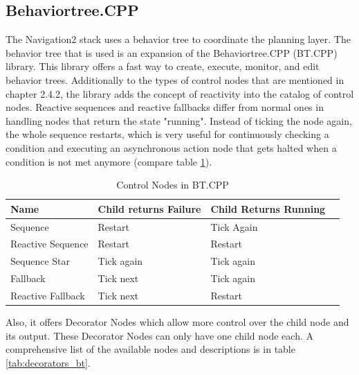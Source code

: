 \subsection{Behaviortree.CPP}
The Navigation2 stack uses a behavior tree to coordinate the planning layer. The behavior tree that is used is an expansion of the Behaviortree.CPP (BT.CPP) library. This library offers a fast way to create, execute, monitor, and edit behavior trees. 
Additionally to the types of control nodes that are mentioned in chapter 2.4.2, the library adds the concept of reactivity into the catalog of control nodes. Reactive sequences and reactive fallbacks differ from normal ones in handling nodes that return the state "running". Instead of ticking the node again, the whole sequence restarts, which is very useful for continuously checking a condition and executing an asynchronous action node that gets halted when a condition is not met anymore (compare table \ref{tab:control_nodes_bt}). 

\begin{table}[ht]
	\caption{Control Nodes in BT.CPP}
	\label{tab:control_nodes_bt}
	\begin{tabular}{ | m{} | m{}| m{} | m{} |} 
  	\hline
  	Name & Child returns Failure & Child Returns Running \\ 
  	\hline
  	Sequence & Restart & Tick Again\\ 
  	\hline
  	Reactive Sequence & Restart & Restart \\ 
  	\hline
  	Sequence Star & Tick again & Tick again \\
  	\hline
  	Fallback & Tick next & Tick again\\
  	\hline  	
  	Reactive Fallback & Tick next & Restart \\
  	\hline
	\end{tabular}
\end{table}

Also, it offers Decorator Nodes which allow more control over the child node and its output. These Decorator Nodes can only have one child node each. A comprehensive list of the available nodes and descriptions is in table \ref{tab:decorators_bt}.

